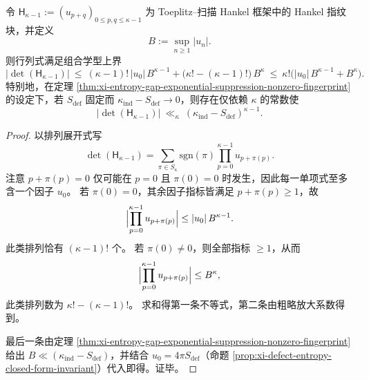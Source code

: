 \begin{proposition}\label{prop:xi-entropy-gap-hankel-determinant-collapse-upper-bound}
令 \(\mathsf H_{\kappa-1}:=(u_{p+q})_{0\le p,q\le \kappa-1}\) 为 Toeplitz--扫描 Hankel 框架中的 Hankel 指纹块，并定义
\[
B:=\sup_{n\ge 1}|u_n|.
\]
则行列式满足组合学型上界
\[
|\det(\mathsf H_{\kappa-1})|
\ \le\
(\kappa-1)!\,|u_0|\,B^{\kappa-1}+\bigl(\kappa!-(\kappa-1)!\bigr)\,B^{\kappa}
\ \le\
\kappa!\bigl(|u_0|\,B^{\kappa-1}+B^{\kappa}\bigr).
\]
特别地，在定理 \ref{thm:xi-entropy-gap-exponential-suppression-nonzero-fingerprint} 的设定下，若 \(S_{\mathrm{def}}\) 固定而 \(\kappa_{\mathrm{ind}}-S_{\mathrm{def}}\to 0\)，则存在仅依赖 \(\kappa\) 的常数使
\[
|\det(\mathsf H_{\kappa-1})|\ \ll_{\kappa}\ (\kappa_{\mathrm{ind}}-S_{\mathrm{def}})^{\kappa-1}.
\]
\end{proposition}
\begin{proof}
以排列展开式写
\[
\det(\mathsf H_{\kappa-1})
=\sum_{\pi\in S_{\kappa}}\mathrm{sgn}(\pi)\prod_{p=0}^{\kappa-1}u_{p+\pi(p)}.
\]
注意 \(p+\pi(p)=0\) 仅可能在 \(p=0\) 且 \(\pi(0)=0\) 时发生，因此每一单项式至多含一个因子 \(u_0\)。
若 \(\pi(0)=0\)，其余因子指标皆满足 \(p+\pi(p)\ge 1\)，故
\[
\Bigl|\prod_{p=0}^{\kappa-1}u_{p+\pi(p)}\Bigr|
\le
|u_0|\,B^{\kappa-1}.
\]
此类排列恰有 \((\kappa-1)!\) 个。
若 \(\pi(0)\neq 0\)，则全部指标 \(\ge 1\)，从而
\[
\Bigl|\prod_{p=0}^{\kappa-1}u_{p+\pi(p)}\Bigr|
\le
B^{\kappa},
\]
此类排列数为 \(\kappa!-(\kappa-1)!\)。
求和得第一条不等式，第二条由粗略放大系数得到。
\par
最后一条由定理 \ref{thm:xi-entropy-gap-exponential-suppression-nonzero-fingerprint} 给出 \(B\ll (\kappa_{\mathrm{ind}}-S_{\mathrm{def}})\)，并结合 \(u_0=4\pi S_{\mathrm{def}}\)（命题 \ref{prop:xi-defect-entropy-closed-form-invariant}）代入即得。证毕。
\end{proof}

